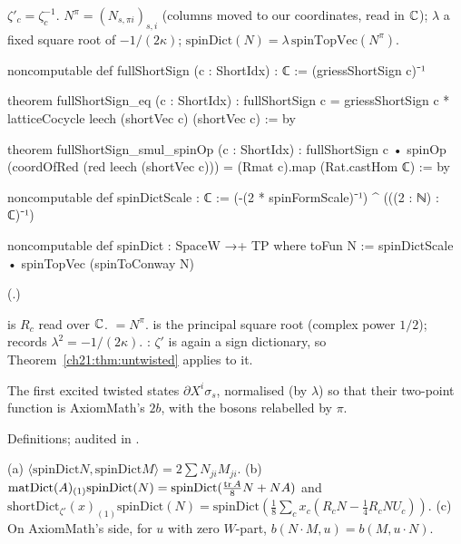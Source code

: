 \begin{definition}\label{ch21:def:spinDict}
$\zeta'_c=\zeta_c^{-1}$.  $N^\pi=(N_{s,\pi i})_{s,i}$ (columns moved to our coordinates, read in ${\mathbb{C}}$);
$\lambda$ a fixed square root of $-1/(2\kappa)$; $\mathrm{spinDict}(N)=\lambda\,\mathrm{spinTopVec}(N^\pi)$.
\end{definition}
\begin{leancode}
noncomputable def fullShortSign (c : ShortIdx) : ℂ := (griessShortSign c)⁻¹
\end{leancode}
\begin{leancode}
theorem fullShortSign_eq (c : ShortIdx) :
    fullShortSign c = griessShortSign c * latticeCocycle leech (shortVec c) (shortVec c) := by
\end{leancode}
\begin{leancode}
theorem fullShortSign_smul_spinOp (c : ShortIdx) :
    fullShortSign c • spinOp (coordOfRed (red leech (shortVec c))) = (Rmat c).map (Rat.castHom ℂ) := by
\end{leancode}
\begin{leancode}
noncomputable def spinDictScale : ℂ := (-(2 * spinFormScale)⁻¹) ^ (((2 : ℕ) : ℂ)⁻¹)
\end{leancode}
\begin{leancode}
noncomputable def spinDict : SpaceW →+ TP where
  toFun N := spinDictScale • spinTopVec (spinToConway N)
\end{leancode}
(.)
\begin{dictionary}
 is $R_c$ read over ${\mathbb{C}}$.   $=N^\pi$.
 is the principal square root (complex power $1/2$);  records
$\lambda^2=-1/(2\kappa)$.  : $\zeta'$ is again a sign dictionary, so
Theorem~\ref{ch21:thm:untwisted} applies to it.
\end{dictionary}
\begin{physics}
The first excited twisted states $\partial X^i\sigma_s$, normalised (by $\lambda$) so that their two-point
function is AxiomMath's $2b$, with the bosons relabelled by $\pi$.
\end{physics}
\begin{status}
Definitions; audited in .
\end{status}
\begin{theorem}\label{ch21:thm:spinDict}
(a) $\langle\mathrm{spinDict}N,\mathrm{spinDict}M\rangle=2\sum N_{ji}M_{ji}$.
(b) $\mathrm{matDict}(A)_{(1)}\mathrm{spinDict}(N)=\mathrm{spinDict}(\tfrac{\operatorname{tr} A}8N+NA)$ and
$\mathrm{shortDict}_{\zeta'}(x)_{(1)}\mathrm{spinDict}(N)=\mathrm{spinDict}(\tfrac18\sum_cx_c(R_cN-\tfrac14R_cNU_c))$.
(c) On AxiomMath's side, for $u$ with zero $W$-part, $b(N\cdot M,u)=b(M,u\cdot N)$.
\end{theorem}
